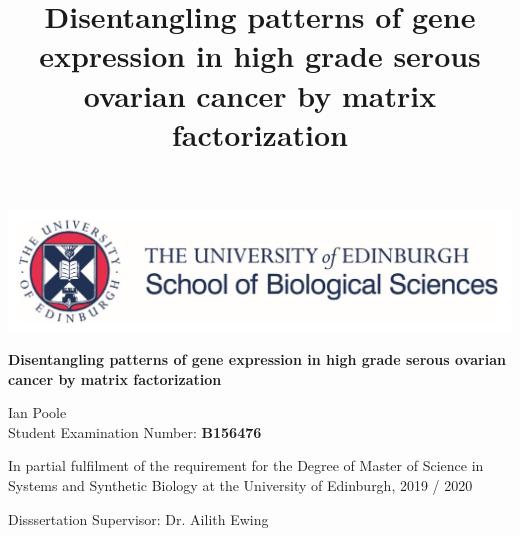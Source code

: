 \documentclass[tikz, 12pt,a4paper,oneside,fleqn]{article}
\title{Disentangling patterns of gene expression in high grade serous ovarian cancer by matrix factorization}
\author{}
\begin{document}
\begin{center}
\begin{center}
\includegraphics[scale=0.3]{images/UoE_SBO_logo.png}
\end{center}

\vspace{0.3in}

\begin{mdframed}
\begin{center}
\Large
\vspace{0.3in}
\bf
Disentangling patterns of gene expression in high grade serous ovarian cancer by matrix factorization
\vspace{0.2in}
\end{center}
\vspace{0.2in}
\end{mdframed}

\vspace{0.3in}

\begin{mdframed}
\begin{center}
\large
\vspace{0.2in}
Ian Poole \\
Student Examination Number: \bf{B156476}
\vspace{0.2in}
\end{center}
\end{mdframed}

\vspace{0.3in}

\begin{mdframed}
\begin{center}
\large
\vspace{0.2in}
In partial fulfilment of the requirement for the Degree of
Master of Science in Systems and Synthetic Biology at the
University of Edinburgh,
2019 / 2020
\vspace{0.2in}
\end{center}
\end{mdframed}

\vspace{0.3in}

\begin{mdframed}
\begin{center}
\large
\vspace{0.2in}

Disssertation Supervisor:  Dr. Ailith Ewing
\vspace{0.2in}
\end{center}
\end{mdframed}
\end{center}
\end{document}
